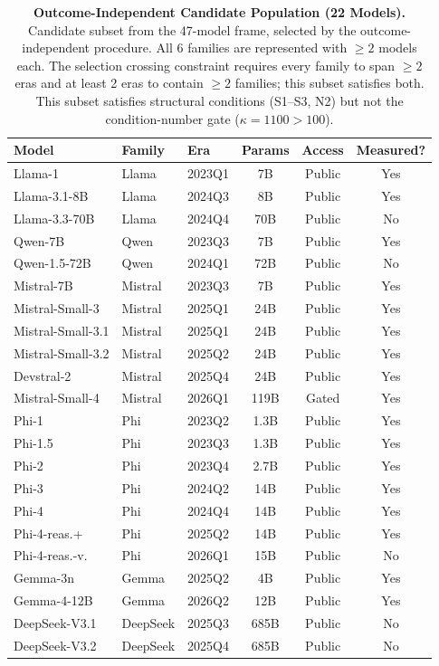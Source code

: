 \documentclass[11pt]{article}
\theoremstyle{definition}
\theoremstyle{plain}
\begin{document}
\begin{table}[!ht]
\caption{\textbf{Outcome-Independent Candidate Population (22 Models).} Candidate subset from the 47-model frame, selected by the outcome-independent procedure. All 6 families are represented with $\geq 2$ models each. The selection crossing constraint requires every family to span $\geq 2$ eras and at least 2 eras to contain $\geq 2$ families; this subset satisfies both. This subset satisfies structural conditions (S1--S3, N2) but not the condition-number gate ($\kappa = 1100 > 100$).}
\label{tab:22model}
\centering
\scriptsize
\setlength{\tabcolsep}{3pt}
\begin{tabular}{l l l c c c}
\hline
\textbf{Model} & \textbf{Family} & \textbf{Era} & \textbf{Params} & \textbf{Access} & \textbf{Measured?} \\
\hline
Llama-1 & Llama & 2023Q1 & 7B & Public & Yes \\
\hline
Llama-3.1-8B & Llama & 2024Q3 & 8B & Public & Yes \\
\hline
Llama-3.3-70B & Llama & 2024Q4 & 70B & Public & No \\
\hline
Qwen-7B & Qwen & 2023Q3 & 7B & Public & Yes \\
\hline
Qwen-1.5-72B & Qwen & 2024Q1 & 72B & Public & No \\
\hline
Mistral-7B & Mistral & 2023Q3 & 7B & Public & Yes \\
\hline
Mistral-Small-3 & Mistral & 2025Q1 & 24B & Public & Yes \\
\hline
Mistral-Small-3.1 & Mistral & 2025Q1 & 24B & Public & Yes \\
\hline
Mistral-Small-3.2 & Mistral & 2025Q2 & 24B & Public & Yes \\
\hline
Devstral-2 & Mistral & 2025Q4 & 24B & Public & Yes \\
\hline
Mistral-Small-4 & Mistral & 2026Q1 & 119B & Gated & Yes \\
\hline
Phi-1 & Phi & 2023Q2 & 1.3B & Public & Yes \\
\hline
Phi-1.5 & Phi & 2023Q3 & 1.3B & Public & Yes \\
\hline
Phi-2 & Phi & 2023Q4 & 2.7B & Public & Yes \\
\hline
Phi-3 & Phi & 2024Q2 & 14B & Public & Yes \\
\hline
Phi-4 & Phi & 2024Q4 & 14B & Public & Yes \\
\hline
Phi-4-reas.+ & Phi & 2025Q2 & 14B & Public & Yes \\
\hline
Phi-4-reas.-v. & Phi & 2026Q1 & 15B & Public & No \\
\hline
Gemma-3n & Gemma & 2025Q2 & 4B & Public & Yes \\
\hline
Gemma-4-12B & Gemma & 2026Q2 & 12B & Public & Yes \\
\hline
DeepSeek-V3.1 & DeepSeek & 2025Q3 & 685B & Public & No \\
\hline
DeepSeek-V3.2 & DeepSeek & 2025Q4 & 685B & Public & No \\
\hline
\end{tabular}
\end{table}
\end{document}
